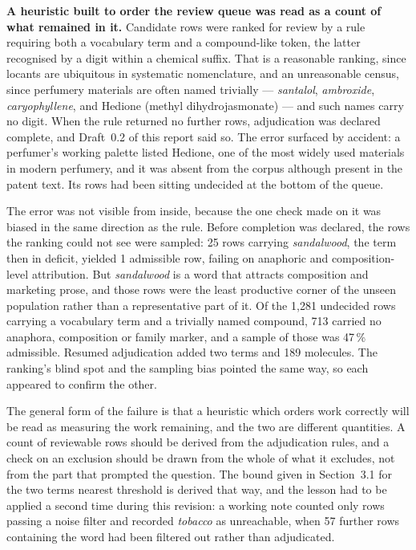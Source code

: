 \documentclass[
  computerscience
]{genesisl1-paper}
\begin{document}
\textbf{A heuristic built to order the review queue was read as a count of what remained
in it.}\label{sec:heuristic} Candidate rows were ranked for review by a rule requiring
both a vocabulary term and a compound-like token, the latter recognised by a digit within
a chemical suffix. That is a reasonable ranking, since locants are ubiquitous in
systematic nomenclature, and an unreasonable census, since perfumery materials are often
named trivially --- \emph{santalol}, \emph{ambroxide}, \emph{caryophyllene}, and Hedione
(methyl dihydrojasmonate) --- and such names carry no digit. When the rule returned no
further rows, adjudication was declared complete, and Draft~0.2 of this report said so.
The error surfaced by accident: a perfumer's working palette listed Hedione, one of the
most widely used materials in modern perfumery, and it was absent from the corpus
although present in the patent text. Its rows had been sitting undecided at the bottom of
the queue.

The error was not visible from inside, because the one check made on it was biased in
the same direction as the rule. Before completion was declared, the rows the ranking
could not see were sampled: 25 rows carrying \emph{sandalwood}, the term then in deficit,
yielded 1 admissible row, failing on anaphoric and composition-level attribution. But
\emph{sandalwood} is a word that attracts composition and marketing prose, and those rows
were the least productive corner of the unseen population rather than a representative
part of it. Of the 1{,}281 undecided rows carrying a vocabulary term and a trivially
named compound, 713 carried no anaphora, composition or family marker, and a sample of
those was 47\,\% admissible. Resumed adjudication added two terms and 189 molecules. The ranking's blind spot and the sampling bias pointed the same
way, so each appeared to confirm the other.

The general form of the failure is that a heuristic which orders work correctly will be
read as measuring the work remaining, and the two are different quantities. A count of
reviewable rows should be derived from the adjudication rules, and a check on an
exclusion should be drawn from the whole of what it excludes, not from the part that
prompted the question. The bound given in Section~3.1 for the two terms nearest
threshold is derived that way, and the lesson had to be applied a second time during this
revision: a working note counted only rows passing a noise filter and recorded
\emph{tobacco} as unreachable, when 57 further rows containing the word had been
filtered out rather than adjudicated.
\end{document}
